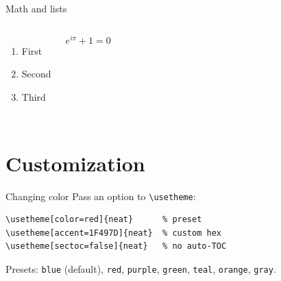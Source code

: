 \documentclass[aspectratio=43]{beamer}
\begin{document}
\begin{frame}{Math and lists}
  \begin{columns}
      \begin{enumerate}
        \item First
        \item Second
        \item Third
      \end{enumerate}
      \[
        e^{i\pi} + 1 = 0
      \]
  \end{columns}
\end{frame}

\section{Customization}

\begin{frame}[fragile]{Changing color}
  Pass an option to \verb|\usetheme|:
  \begin{verbatim}
\usetheme[color=red]{neat}      % preset
\usetheme[accent=1F497D]{neat}  % custom hex
\usetheme[sectoc=false]{neat}   % no auto-TOC
  \end{verbatim}
  Presets: \texttt{blue} (default), \texttt{red}, \texttt{purple},
  \texttt{green}, \texttt{teal}, \texttt{orange}, \texttt{gray}.
\end{frame}
\end{document}
